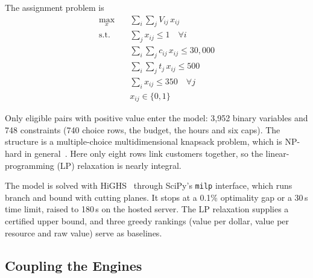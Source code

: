 \documentclass[conference]{IEEEtran}
\begin{document}
The assignment problem is
\begin{equation}
\begin{aligned}
\max_{x}\quad & \textstyle\sum_{i}\sum_{j} V_{ij}\,x_{ij} \\
\text{s.t.}\quad & \textstyle\sum_{j} x_{ij} \le 1 \quad \forall i \\
& \textstyle\sum_{i}\sum_{j} c_{ij}\,x_{ij} \le 30{,}000 \\
& \textstyle\sum_{i}\sum_{j} t_{j}\,x_{ij} \le 500 \\
& \textstyle\sum_{i} x_{ij} \le 350 \quad \forall j \\
& x_{ij} \in \{0,1\}
\end{aligned}
\label{eq:bip}
\end{equation}

Only eligible pairs with positive value enter the model: 3,952 binary variables and 748 constraints (740 choice rows, the budget, the hours and six caps). The structure is a multiple-choice multidimensional knapsack problem, which is NP-hard in general~\cite{b16}. Here only eight rows link customers together, so the linear-programming (LP) relaxation is nearly integral.

The model is solved with HiGHS~\cite{b17} through SciPy's \texttt{milp} interface, which runs branch and bound with cutting planes. It stops at a 0.1\% optimality gap or a 30\,s time limit, raised to 180\,s on the hosted server. The LP relaxation supplies a certified upper bound, and three greedy rankings (value per dollar, value per resource and raw value) serve as baselines.

\subsection{Coupling the Engines}
\label{sec:coupling}
\end{document}

